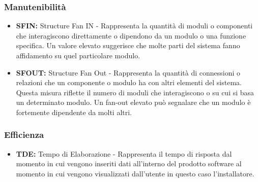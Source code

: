\subsubsection{Manutenibilità}
\begin{itemize}
    \item \textbf{SFIN:} Structure Fan IN - Rappresenta la quantità di moduli o componenti che interagiscono direttamente o dipendono da un modulo o una funzione specifica. Un valore elevato suggerisce che molte parti del sistema fanno affidamento su quel particolare modulo.
    \item \textbf{SFOUT:} Structure Fan Out - Rappresenta la quantità di connessioni o relazioni che un componente o modulo ha con altri elementi del sistema. Questa misura riflette il numero di moduli che interagiscono o su cui si basa un determinato modulo. Un fan-out elevato può segnalare che un modulo è fortemente dipendente da molti altri.
\end{itemize}
\subsubsection{Efficienza}
\begin{itemize}
    \item \textbf{TDE:} Tempo di Elaborazione - Rappresenta il tempo di risposta dal momento in cui vengono inseriti dati all'interno del prodotto software al momento in cui vengono visualizzati dall'utente in questo caso l'installatore.
\end{itemize}